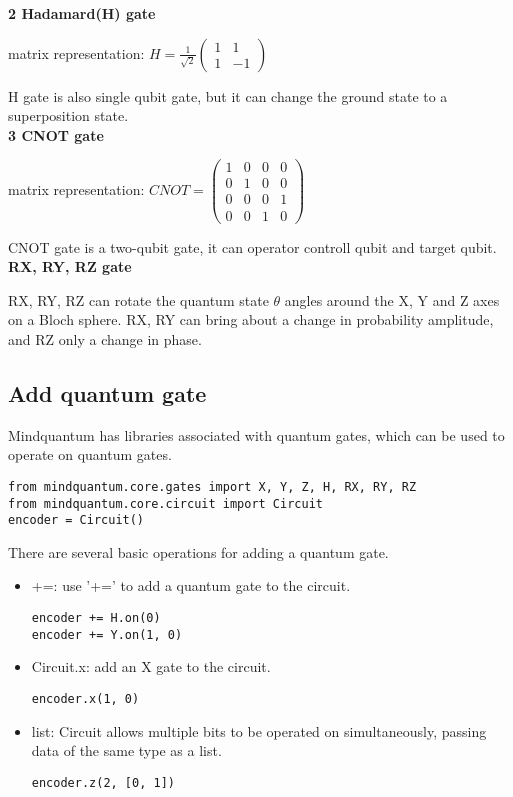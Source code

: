 \textbf{2 Hadamard(H) gate}

matrix representation: $H = \frac{1}{\sqrt{2}} \left( \begin{array}{cc}
     1 & 1 \\
     1 & -1 
\end{array} \right)$  

H gate is also single qubit gate, but it can change the ground state to a superposition state. \\

\textbf{3 CNOT gate}

matrix representation: $CNOT = \left( \begin{array}{cccc}
     1 & 0 & 0 & 0 \\
     0 & 1 & 0 & 0 \\
     0 & 0 & 0 & 1 \\
     0 & 0 & 1 & 0
\end{array} \right)$  

CNOT gate is a two-qubit gate, it can operator controll qubit and target qubit. \\

\textbf{RX, RY, RZ gate}

RX, RY, RZ can rotate the quantum state $\theta$ angles around the X, Y and Z axes on a Bloch sphere. RX, RY can bring about a change in probability amplitude, and RZ only a change in phase.
\subsection{Add quantum gate}
Mindquantum has libraries associated with quantum gates, which can be used to operate on quantum gates. 
\begin{lstlisting}
from mindquantum.core.gates import X, Y, Z, H, RX, RY, RZ
from mindquantum.core.circuit import Circuit
encoder = Circuit()
\end{lstlisting}
There are several basic operations for adding a quantum gate.
\begin{itemize}
    \item +=: use '+=' to add a quantum gate to the circuit.
    \begin{lstlisting}
encoder += H.on(0) 
encoder += Y.on(1, 0) 
    \end{lstlisting}
    \item Circuit.x: add an X gate to the circuit.
    \begin{lstlisting}
encoder.x(1, 0)
    \end{lstlisting}
    \item list: Circuit allows multiple bits to be operated on simultaneously, passing data of the same type as a list.  
    \begin{lstlisting}
encoder.z(2, [0, 1])        
    \end{lstlisting}
\end{itemize}
